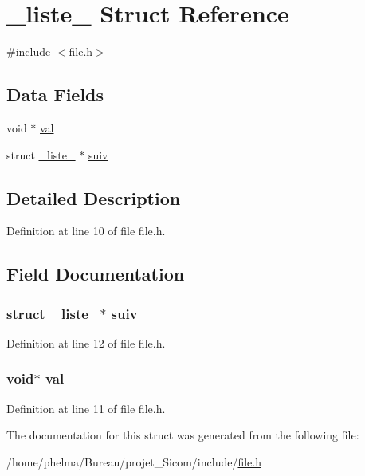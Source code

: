 \hypertarget{struct__liste__}{\section{\-\_\-liste\-\_\- Struct Reference}
\label{struct__liste__}
}


{\ttfamily \#include $<$file.\-h$>$}

\subsection*{Data Fields}
\begin{DoxyCompactItemize}
\item 
void $\ast$ \hyperlink{struct__liste___ab03f36f103bdec81305fd301f1f93885}{val}
\item 
struct \hyperlink{struct__liste__}{\-\_\-liste\-\_\-} $\ast$ \hyperlink{struct__liste___a224c1138c8377ec8fc3eb576745afd8b}{suiv}
\end{DoxyCompactItemize}


\subsection{Detailed Description}


Definition at line 10 of file file.\-h.



\subsection{Field Documentation}
\hypertarget{struct__liste___a224c1138c8377ec8fc3eb576745afd8b}{
\subsubsection[{suiv}]{\setlength{\rightskip}{0pt plus 5cm}struct {\bf \-\_\-liste\-\_\-}$\ast$ suiv}}\label{struct__liste___a224c1138c8377ec8fc3eb576745afd8b}


Definition at line 12 of file file.\-h.

\hypertarget{struct__liste___ab03f36f103bdec81305fd301f1f93885}{
\subsubsection[{val}]{\setlength{\rightskip}{0pt plus 5cm}void$\ast$ val}}\label{struct__liste___ab03f36f103bdec81305fd301f1f93885}


Definition at line 11 of file file.\-h.



The documentation for this struct was generated from the following file\-:\begin{DoxyCompactItemize}
\item 
/home/phelma/\-Bureau/projet\-\_\-\-Sicom/include/\hyperlink{file_8h}{file.\-h}\end{DoxyCompactItemize}
